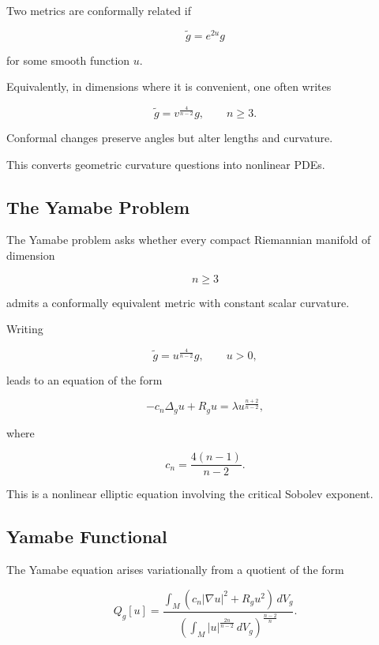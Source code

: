 Two metrics are conformally related if

\[
\boxed{
\widetilde g
=
e^{2u}g
}
\]

for some smooth function \(u\).

Equivalently, in dimensions where it is convenient, one often writes

\[
\boxed{
\widetilde g
=
v^{\frac{4}{n-2}}g,
\qquad
n\geq3.
}
\]

Conformal changes preserve angles but alter lengths and curvature.

This converts geometric curvature questions into nonlinear PDEs.

\subsection{The Yamabe Problem}
\label{subsec:yamabe-problem}

The Yamabe problem asks whether every compact Riemannian manifold of
dimension

\[
n\geq3
\]

admits a conformally equivalent metric with constant scalar curvature.

Writing

\[
\widetilde g
=
u^{\frac{4}{n-2}}g,
\qquad
u>0,
\]

leads to an equation of the form

\[
\boxed{
-c_n\Delta_g u
+
R_g u
=
\lambda
u^{\frac{n+2}{n-2}},
}
\]

where

\[
\boxed{
c_n
=
\frac{4(n-1)}{n-2}.
}
\]

This is a nonlinear elliptic equation involving the critical Sobolev
exponent.

\subsection{Yamabe Functional}
\label{subsec:yamabe-functional}

The Yamabe equation arises variationally from a quotient of the form

\[
\boxed{
Q_g[u]
=
\frac{
\displaystyle
\int_M
\left(
c_n|\nabla u|^2
+
R_gu^2
\right)
\,dV_g
}{
\displaystyle
\left(
\int_M
|u|^{\frac{2n}{n-2}}
\,dV_g
\right)^{\frac{n-2}{n}}
}.
}
\]

